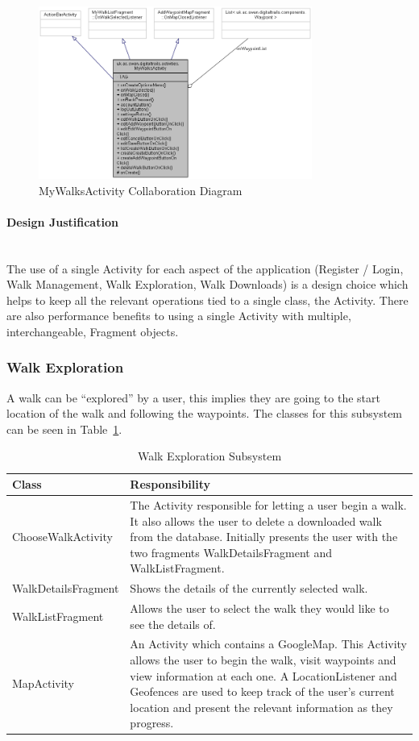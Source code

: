 \documentclass[11pt,a4paper]{report}
\begin{document}
\begin{figure}[H]
    \centering
    \includegraphics[width=0.8\textwidth]{mywalksactcollab}
    \caption{MyWalksActivity Collaboration Diagram}
    \label{fig:mywalksactcollab}
\end{figure}
\paragraph*{Design Justification}\mbox{}\\ 
The use of a single Activity for each aspect of the application (Register / Login, Walk Management, Walk Exploration, Walk Downloads) is a design choice which helps to keep all the relevant operations tied to a single class, the Activity. There are also performance benefits to using a single Activity with multiple, interchangeable, Fragment objects.

\subsubsection{Walk Exploration}
\label{sec:walkexplore}
A walk can be ``explored'' by a user, this implies they are going to the start location of the walk and following the waypoints. The classes for this subsystem can be seen in Table~\ref{tab:walkexplore}.

\begin{longtable}{|p{5cm}|p{10cm}|}
\hline \caption{Walk Exploration Subsystem - Cont. on Next Page.} \endfoot
\hline \caption{Walk Exploration Subsystem} \label{tab:walkexplore} \endlastfoot
\hline
\textbf{Class} & \textbf{Responsibility} \\ \hline
ChooseWalkActivity & The Activity responsible for letting a user begin a walk. It also allows the user to delete a downloaded walk from the database. Initially presents the user with the two fragments WalkDetailsFragment and WalkListFragment. \\ \hline
WalkDetailsFragment & Shows the details of the currently selected walk. \\ \hline
WalkListFragment & Allows the user to select the walk they would like to see the details of. \\ \hline
MapActivity & An Activity which contains a GoogleMap. This Activity allows the user to begin the walk, visit waypoints and view information at each one. A LocationListener and Geofences are used to keep track of the user's current location and present the relevant information as they progress. \\ \hline
\end{longtable}
\end{document}
